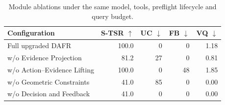 \begin{table}[t]
\centering
\small
\setlength{\tabcolsep}{3pt}
\begin{tabular}{lrrrr}
\toprule
Configuration & S-TSR $\uparrow$ & UC $\downarrow$ & FB $\downarrow$ & VQ $\downarrow$ \\
\midrule
Full upgraded DAFR & 100.0 & 0 & 0 & 1.18 \\
w/o Evidence Projection & 81.2 & 27 & 0 & 0.81 \\
w/o Action--Evidence Lifting & 100.0 & 0 & 48 & 1.85 \\
w/o Geometric Constraints & 41.0 & 85 & 0 & 0.00 \\
w/o Decision and Feedback & 41.0 & 0 & 0 & 0.00 \\
\bottomrule
\end{tabular}
\caption{Module ablations under the same model, tools, preflight lifecycle and query budget.}
\label{tab:flash-geometry-ablation}
\end{table}
